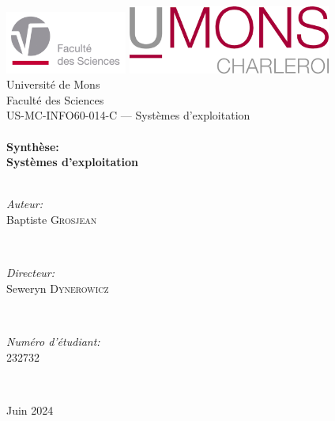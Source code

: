 
\begin{titlepage}

	\begin{center}
	\includegraphics[width=0.3\textwidth]{./Images/Logos/fs.pdf}\hfill
	\includegraphics[width=0.5\textwidth]{./Images/Logos/umons_charleroi.png}\\[1cm]
	
	{\LARGE Université de Mons}\\[0.5cm]
	{\Large Faculté des Sciences}\\[1cm]
	
	{\Large US-MC-INFO60-014-C — Systèmes d'exploitation}\\[1cm]
	
	\HRule \\[0.4cm]
	{ \Huge \bfseries Synthèse:}\\[0.2cm]
	{ \LARGE \bfseries Systèmes d'exploitation}\\[0.4cm]
	\HRule \\[1.5cm]
	
	\begin{minipage}{0.4\textwidth}
	\begin{flushleft} \large
	\emph{Auteur:}\\
	Baptiste \textsc{Grosjean}
	\end{flushleft}
	\end{minipage}
	~
	\begin{minipage}{0.4\textwidth}
	\begin{flushright} \large
	\emph{Directeur:}\\
	Seweryn \textsc{Dynerowicz}
	\end{flushright}
	\end{minipage}\\[2cm]
	
	\begin{minipage}{0.4\textwidth}
	\begin{flushleft} \large
	\emph{Numéro d'étudiant:}\\
	232732
	\end{flushleft}
	\end{minipage}\\[2cm]
	
	\renewcommand{\abstractname}{Résumé}
	\begin{abstract}
	\end{abstract}
	
	\vfill
	
	{\large Juin 2024}
	\end{center}
	\end{titlepage}